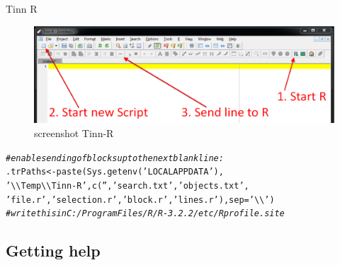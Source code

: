\documentclass[xcolor=table,       handout,    xcolor=dvipsnames]{beamer}\usepackage[]{graphicx}\usepackage[]{color}
\makeatletter
\newcommand{\hlstr}[1]{\textcolor[rgb]{0.545,0.137,0.137}{#1}}
\newcommand{\hlcom}[1]{\textcolor[rgb]{0,0.392,0}{\textit{#1}}}
\newcommand{\hlstd}[1]{\textcolor[rgb]{0,0,0}{#1}}
\newcommand{\hlkwb}[1]{\textcolor[rgb]{0,0,0}{#1}}
\newcommand{\hlkwc}[1]{\textcolor[rgb]{1,0,1}{#1}}
\newcommand{\hlkwd}[1]{\textcolor[rgb]{0,0,1}{#1}}
\newenvironment{kframe}{%
 \def\at@end@of@kframe{}%
 \ifinner\ifhmode%
  \def\at@end@of@kframe{\end{minipage}}%
  \begin{minipage}{\columnwidth}%
 \fi\fi%
 \def\FrameCommand##1{\hskip\@totalleftmargin \hskip-\fboxsep
 \colorbox{shadecolor}{##1}\hskip-\fboxsep
     \hskip-\linewidth \hskip-\@totalleftmargin \hskip\columnwidth}%
 \MakeFramed {\advance\hsize-\width
   \@totalleftmargin\z@ \linewidth\hsize
   \@setminipage}}%
 {\par\unskip\endMakeFramed%
 \at@end@of@kframe}
\newenvironment{knitrout}{}{} %
\makeatother
\begin{document}
\begin{frame}[fragile]{Tinn R}
  \begin{figure}[h]
    \begin{center}
    \includegraphics[width=.8\linewidth]{./externalfig/TinnR_gui.png}
		\caption{screenshot Tinn-R}
		\label{fig:how to start R from Tinn-R}
    \end{center}
	\end{figure}
\begin{knitrout}\scriptsize
{}\color{fgcolor}\begin{kframe}
\begin{alltt}
\hlcom{# enable sending of blocks up to the next blank line:}
\hlstd{.trPaths} \hlkwb{<-} \hlkwd{paste}\hlstd{(}\hlkwd{Sys.getenv}\hlstd{(}\hlstr{'LOCALAPPDATA'}\hlstd{),}
\hlstr{'\textbackslash{}\textbackslash{}Temp\textbackslash{}\textbackslash{}Tinn-R'}\hlstd{,} \hlkwd{c}\hlstd{(}\hlstr{''}\hlstd{,} \hlstr{'search.txt'}\hlstd{,} \hlstr{'objects.txt'}\hlstd{,}
\hlstr{'file.r'}\hlstd{,} \hlstr{'selection.r'}\hlstd{,} \hlstr{'block.r'}\hlstd{,}\hlstr{'lines.r'}\hlstd{),}\hlkwc{sep}\hlstd{=}\hlstr{'\textbackslash{}\textbackslash{}'}\hlstd{)}
\hlcom{# write this in  C:/Program Files/R/R-3.2.2/etc/Rprofile.site}
\end{alltt}
\end{kframe}
\end{knitrout}
\end{frame}

\subsection{Getting help}
\end{document}
